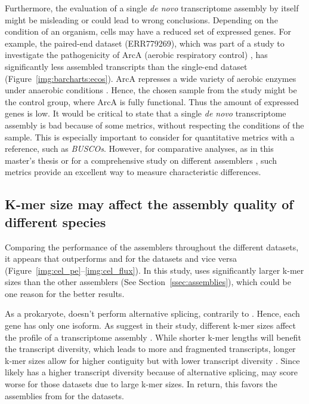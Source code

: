\documentclass[12pt,a4paper,english]{article}
\begin{document}
		Furthermore, the evaluation of a single \textit{de novo} transcriptome assembly by itself might be misleading or could lead to wrong conclusions.
		Depending on the condition of an organism, cells may have a reduced set of expressed genes.
		For example, the paired-end \ecoli dataset (ERR779269), which was part of a study to investigate the pathogenicity of ArcA (aerobic respiratory control) \citep{arca_study:15}, has significantly less assembled transcripts than the single-end \ecoli dataset (Figure~\ref{img:barcharts:ecos}).
		ArcA represses a wide variety of aerobic enzymes under anaerobic conditions \citep{arca_function:88}.
		Hence, the chosen sample from the study might be the control group, where ArcA is fully functional. Thus the amount of expressed genes is low.
		It would be critical to state that a single \textit{de novo} transcriptome assembly is bad because of some metrics, without respecting the conditions of the sample. This is especially important to consider for quantitative metrics with a reference, such as \textit{BUSCOs}.
		However, for comparative analyses, as in this master's thesis or for a comprehensive study on different assemblers \citep{hoelzer:19}, such metrics provide an excellent way to measure characteristic differences.

	\subsection{K-mer size may affect the assembly quality of different species}
	    Comparing the performance of the assemblers throughout the different datasets, it appears that \soap outperforms \spades and \trinity for the \ecoli datasets and vice versa (Figure~\ref{img:cel_pe}--\ref{img:cel_flux}).
		In this study, \soap uses significantly larger k-mer sizes than the other assemblers (See Section~\ref{ssec:assemblies}), which could be one reason for the better results.
		
		As a prokaryote, \ecoli doesn't perform alternative splicing, contrarily to \celegans \citep{celegans_splicing:17}. Hence, each gene has only one isoform.
		As \citeauthor{optimization:10} suggest in their study, different k-mer sizes affect the profile of a transcriptome assembly \citep{optimization:10}.
		While shorter k-mer lengths will benefit the transcript diversity, which leads to more and fragmented transcripts, longer k-mer sizes allow for higher contiguity but with lower transcript diversity \citep{optimization:10}.
		Since \celegans likely has a higher transcript diversity because of alternative splicing, \soap may score worse for those datasets due to large k-mer sizes. In return, this favors the assemblies from \soap for the \ecoli datasets.
		
\end{document}
